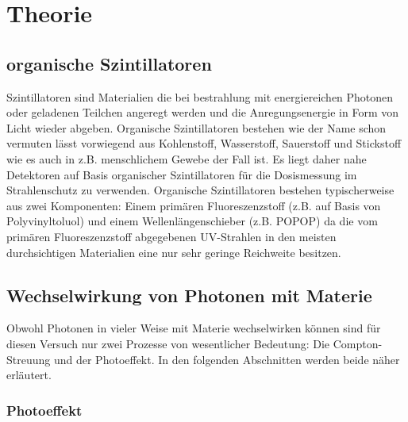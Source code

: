 \section{Theorie}

\subsection{organische Szintillatoren}

Szintillatoren sind  Materialien die bei bestrahlung mit energiereichen Photonen oder geladenen Teilchen angeregt werden und die Anregungsenergie in Form von Licht wieder abgeben. Organische Szintillatoren bestehen wie der Name schon vermuten lässt vorwiegend aus Kohlenstoff, Wasserstoff, Sauerstoff und Stickstoff wie es auch in z.B. menschlichem Gewebe der Fall ist. Es liegt daher nahe Detektoren auf Basis organischer Szintillatoren für die Dosismessung im Strahlenschutz zu verwenden. Organische Szintillatoren bestehen typischerweise aus zwei Komponenten: Einem primären Fluoreszenzstoff (z.B. auf Basis von Polyvinyltoluol) und einem \glqq Wellenlängenschieber \grqq{} (z.B. POPOP) da die vom primären Fluoreszenzstoff abgegebenen UV-Strahlen in den meisten durchsichtigen Materialien eine nur sehr geringe Reichweite besitzen.

\subsection{Wechselwirkung von Photonen mit Materie}

Obwohl Photonen in vieler Weise mit Materie wechselwirken können sind für diesen Versuch nur zwei Prozesse von wesentlicher Bedeutung: Die Compton-Streuung und der Photoeffekt. In den folgenden Abschnitten werden beide näher erläutert.

\subsubsection{Photoeffekt}

